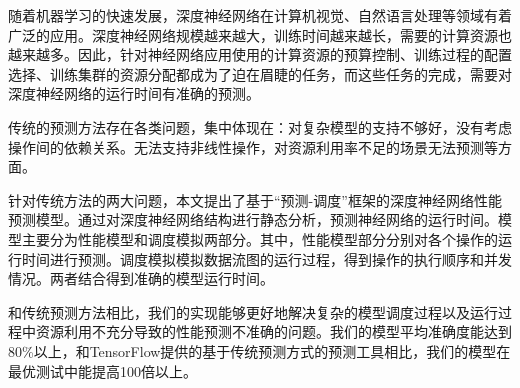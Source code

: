 
\begin{cabstract}
    随着机器学习的快速发展，深度神经网络在计算机视觉、自然语言处理等领域有着广泛的应用。深度神经网络规模越来越大，训练时间越来越长，需要的计算资源也越来越多。因此，针对神经网络应用使用的计算资源的预算控制、训练过程的配置选择、训练集群的资源分配都成为了迫在眉睫的任务，而这些任务的完成，需要对深度神经网络的运行时间有准确的预测。

    传统的预测方法存在各类问题，集中体现在：对复杂模型的支持不够好，没有考虑操作间的依赖关系。无法支持非线性操作，对资源利用率不足的场景无法预测等方面。
    
    针对传统方法的两大问题，本文提出了基于“预测-调度”框架的深度神经网络性能预测模型。通过对深度神经网络结构进行静态分析，预测神经网络的运行时间。模型主要分为性能模型和调度模拟两部分。其中，性能模型部分分别对各个操作的运行时间进行预测。调度模拟模拟数据流图的运行过程，得到操作的执行顺序和并发情况。两者结合得到准确的模型运行时间。
    
    和传统预测方法相比，我们的实现能够更好地解决复杂的模型调度过程以及运行过程中资源利用不充分导致的性能预测不准确的问题。我们的模型平均准确度能达到80\%以上，和TensorFlow提供的基于传统预测方式的预测工具相比，我们的模型在最优测试中能提高100倍以上。

\end{cabstract}


